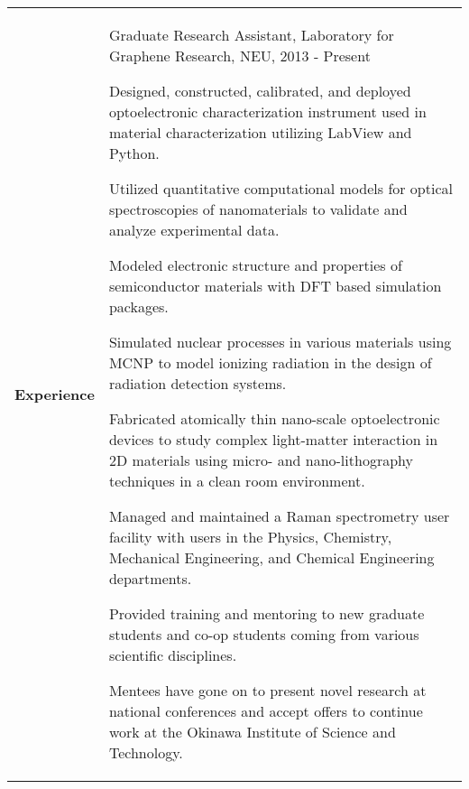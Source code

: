 \documentclass{article}
\begin{document}
\begin{center}
\begin{tabularx}{\linewidth}{>{\raggedright\bf\large{}}p{3.0cm}X}
 Experience & {\large Graduate Research Assistant, Laboratory for Graphene Research, NEU}, 2013 - Present
 \begin{compactitem}
	\item Designed, constructed, calibrated, and deployed optoelectronic characterization instrument  used in material characterization utilizing LabView and Python. 
	\item Utilized quantitative computational models for optical spectroscopies of nanomaterials to validate and analyze experimental data.
	\item Modeled electronic structure and properties of semiconductor materials with DFT based simulation packages.
	\item Simulated nuclear processes in various materials using MCNP to model ionizing radiation in the design of radiation detection systems.
 	\item Fabricated atomically thin nano-scale optoelectronic devices to study complex light-matter interaction in 2D materials using micro- and nano-lithography techniques in a clean room environment. 
 	\item Managed and maintained a Raman spectrometry user facility with users in the Physics, Chemistry, Mechanical Engineering, and Chemical Engineering departments.
 	\item Provided training and mentoring to new graduate students and co-op students coming from various scientific disciplines.
 	\begin{compactitem}
 		\item Mentees have gone on to present novel research at national conferences and accept offers to continue work at the Okinawa Institute of Science and Technology.
 	\end{compactitem}
 \end{compactitem} \\ 



\end{tabularx}
\end{center}
\end{document}
